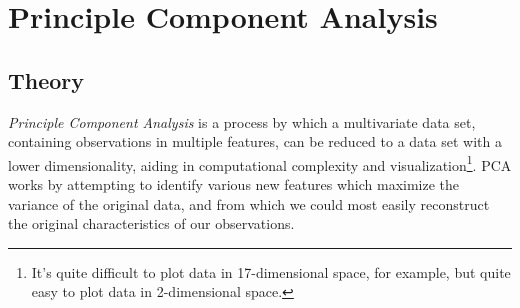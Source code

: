 \chapter{Principle Component Analysis}

\section{Theory}
\emph{Principle Component Analysis} is a process by which a multivariate data set, containing observations in multiple features, can be reduced to a data set with a lower dimensionality, aiding in computational complexity and visualization\footnote{It's quite difficult to plot data in 17-dimensional space, for example, but quite easy to plot data in 2-dimensional space.}. PCA works by attempting to identify various new features which maximize the variance of the original data, and from which we could most easily reconstruct the original characteristics of our observations.

